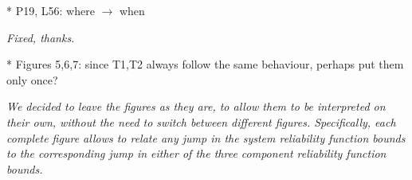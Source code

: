 \documentclass[12pt, a4paper]{elsarticle}
\begin{document}
* P19, L56: where $\to$ when

\medskip
\emph{Fixed, thanks.}
\medskip

* Figures 5,6,7: since T1,T2 always follow the same behaviour, perhaps put them only once?

\medskip
\emph{We decided to leave the figures as they are, to allow them to be interpreted on their own,
without the need to switch between different figures.
Specifically, each complete figure allows to relate any jump in the system reliability function bounds
to the corresponding jump in either of the three component reliability function bounds.}
\medskip
\end{document}
